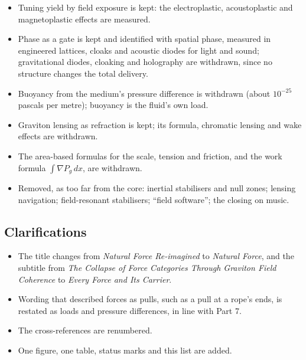 \documentclass[11pt,a4paper]{article}
\begin{document}
\begin{itemize}
\item Tuning yield by field exposure is kept: the electroplastic, acoustoplastic and magnetoplastic effects are measured.
\item Phase as a gate is kept and identified with spatial phase, measured in engineered lattices, cloaks and acoustic diodes for light and sound; gravitational diodes, cloaking and holography are withdrawn, since no structure changes the total delivery.
\item Buoyancy from the medium's pressure difference is withdrawn (about $10^{-25}$ pascals per metre); buoyancy is the fluid's own load.
\item Graviton lensing as refraction is kept; its formula, chromatic lensing and wake effects are withdrawn.
\item The area-based formulas for the scale, tension and friction, and the work formula $\int\nabla P_g\,dx$, are withdrawn.
\item Removed, as too far from the core: inertial stabilisers and null zones; lensing navigation; field-resonant stabilisers; ``field software''; the closing on music.
\end{itemize}

\subsection*{Clarifications}
\begin{itemize}
\item The title changes from \textit{Natural Force Re-imagined} to \textit{Natural Force}, and the subtitle from \textit{The Collapse of Force Categories Through Graviton Field Coherence} to \textit{Every Force and Its Carrier}.
\item Wording that described forces as pulls, such as a pull at a rope's ends, is restated as loads and pressure differences, in line with Part 7.
\item The cross-references are renumbered.
\item One figure, one table, status marks and this list are added.
\end{itemize}

\nocite{rashadaPart14,rashadaPart15,rashadaPart17,rashadaPart26}

\end{document}
